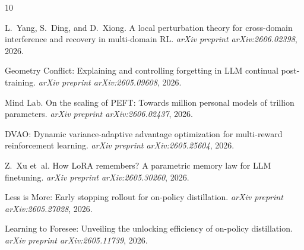 \documentclass[11pt,a4paper]{article}
\begin{document}

\begin{thebibliography}{10}

L.~Yang, S.~Ding, and D.~Xiong.
\newblock A local perturbation theory for cross-domain interference and recovery in multi-domain {RL}.
\newblock \emph{arXiv preprint arXiv:2606.02398}, 2026.

Geometry Conflict: Explaining and controlling forgetting in {LLM} continual post-training.
\newblock \emph{arXiv preprint arXiv:2605.09608}, 2026.

Mind Lab.
\newblock On the scaling of {PEFT}: Towards million personal models of trillion parameters.
\newblock \emph{arXiv preprint arXiv:2606.02437}, 2026.

DVAO: Dynamic variance-adaptive advantage optimization for multi-reward reinforcement learning.
\newblock \emph{arXiv preprint arXiv:2605.25604}, 2026.

Z.~Xu et~al.
\newblock How {LoRA} remembers? {A} parametric memory law for {LLM} finetuning.
\newblock \emph{arXiv preprint arXiv:2605.30260}, 2026.

Less is More: Early stopping rollout for on-policy distillation.
\newblock \emph{arXiv preprint arXiv:2605.27028}, 2026.

Learning to Foresee: Unveiling the unlocking efficiency of on-policy distillation.
\newblock \emph{arXiv preprint arXiv:2605.11739}, 2026.

\end{thebibliography}
\end{document}
